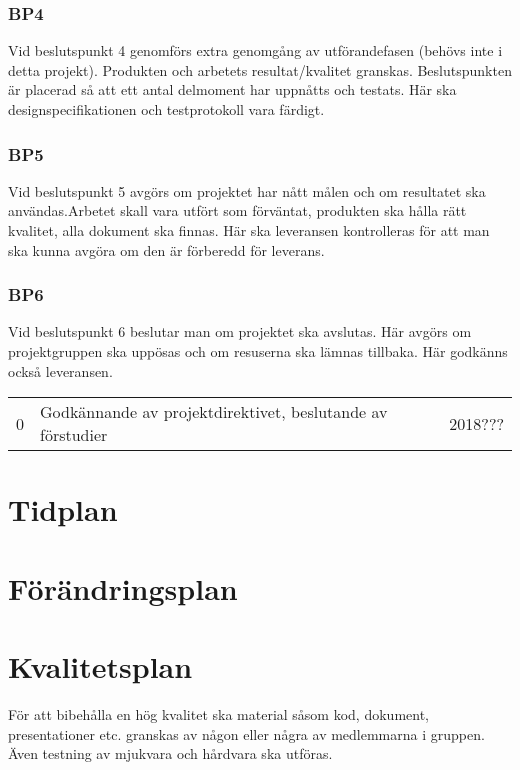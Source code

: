 \documentclass[projektplan/plan.tex]{subfiles}
\begin{document}
\subsubsection*{BP4}
Vid beslutspunkt 4 genomförs extra genomgång av utförandefasen (behövs inte i
detta projekt). Produkten och
arbetets resultat/kvalitet granskas. Beslutspunkten är placerad så att ett
antal delmoment har uppnåtts och testats. Här ska designspecifikationen och
testprotokoll vara färdigt.

\subsubsection*{BP5}
Vid beslutspunkt 5 avgörs om projektet har nått målen och om resultatet ska
användas.Arbetet skall vara utfört som förväntat, produkten ska hålla rätt
kvalitet, alla dokument ska finnas. Här ska leveransen kontrolleras för att man
ska kunna avgöra om den är förberedd för leverans.

\subsubsection*{BP6}
Vid beslutspunkt 6 beslutar man om projektet ska avslutas. Här avgörs om
projektgruppen ska uppösas och om resuserna ska lämnas tillbaka. Här godkänns
också leveransen.

\begin{center}
    \begin{tabular}{| l | l | l |}
    0 & Godkännande av projektdirektivet, beslutande av förstudier & 2018??? 
    \end{tabular}
\end{center}    


\section{Tidplan}

\section{Förändringsplan}

\section{Kvalitetsplan}
För att bibehålla en hög kvalitet ska material såsom kod, dokument, presentationer etc. granskas av någon eller några av medlemmarna i gruppen.
Även testning av mjukvara och hårdvara ska utföras.
\end{document}
